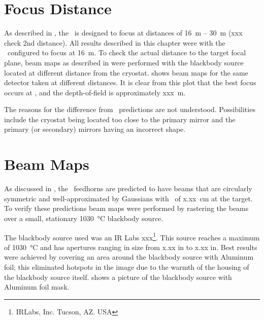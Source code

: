 
\section{Focus Distance}\label{s:focus-distance}

As described in , the \Imager\ is designed to focus at distances of 16~m -- 30~m (xxx check 2nd distance).
All results described in this chapter were with the \Imager\ configured to focus at 16~m.
To check the actual distance to the target focal plane, beam maps as described in  were performed with the blackbody source located at different distance from the cryostat.
 shows beam maps for the same detector taken at different distances.
It is clear from this plot that the best focus occurs at , and the depth-of-field is approximately xxx~m.

The reasons for the difference from \ZEMAX\ predictions are not understood.
Possibilities include the cryostat being located too close to the primary mirror and the primary (or secondary) mirrors having an incorrect shape.

\section{Beam Maps} \label{sec:ch8-beam-maps}

As discussed in , the \Imager\ feedhorns are predicted to have beams that are circularly symmetric and well-approximated by Gaussians with \FWHM\ of x.xx~cm at the target.
To verify these predictions beam maps were performed by rastering the beams over a small, stationary \SI{1030}{\celsius} blackbody source.

The blackbody source used was an IR Labs xxx\footnote{IRLabs, Inc. Tucson, AZ. USA}.
This source reaches a maximum of \SI{1030}{\celsius} and has apertures ranging in size from x.xx in to x.xx in.
Best results were achieved by covering an area around the blackbody source with Aluminum foil; this eliminated hotspots in the image due to the warmth of the housing of the blackbody source itself.
 shows a picture of the blackbody source with Aluminum foil mask.

